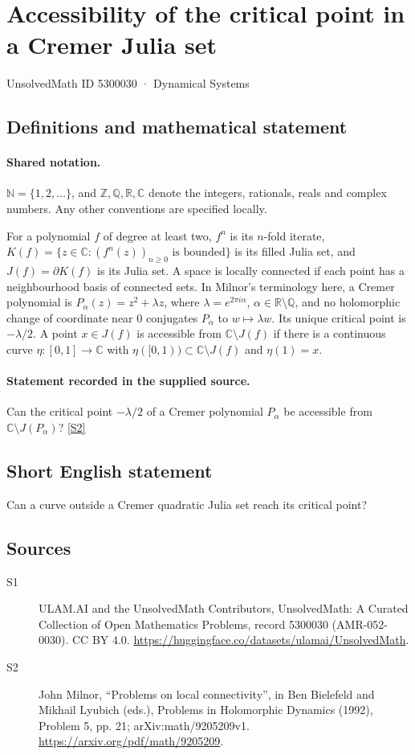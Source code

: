 \documentclass[11pt]{article}
\newcommand{\sref}[2]{\hyperlink{source:#1:#2}{[S#2]}}
\begin{document}
\setcounter{section}{5300029}
\section{Accessibility of the critical point in a Cremer Julia set}\label{5300030}
{\small\sffamily UnsolvedMath ID 5300030 · Dynamical Systems}
\subsection{Definitions and mathematical statement}

\paragraph{Shared notation.}$\mathbb N=\{1,2,\ldots\}$, and $\mathbb Z,\mathbb Q,\mathbb R,\mathbb C$ denote the integers, rationals, reals and complex numbers. Any other conventions are specified locally.


For a polynomial $f$ of degree at least two, $f^n$ is its $n$-fold iterate, $K(f)=\{z\in\mathbb C:(f^n(z))_{n\geq0}\text{ is bounded}\}$ is its filled Julia set, and $J(f)=\partial K(f)$ is its Julia set. A space is locally connected if each point has a neighbourhood basis of connected sets. In Milnor's terminology here, a Cremer polynomial is $P_\alpha(z)=z^2+\lambda z$, where $\lambda=e^{2\pi i\alpha}$, $\alpha\in\mathbb R\setminus\mathbb Q$, and no holomorphic change of coordinate near $0$ conjugates $P_\alpha$ to $w\mapsto\lambda w$. Its unique critical point is $-\lambda/2$. A point $x\in J(f)$ is accessible from $\mathbb C\setminus J(f)$ if there is a continuous curve $\eta:[0,1]\to\mathbb C$ with $\eta([0,1))\subset\mathbb C\setminus J(f)$ and $\eta(1)=x$.
\paragraph{Statement recorded in the supplied source.}
Can the critical point $-\lambda/2$ of a Cremer polynomial $P_\alpha$ be accessible from $\mathbb C\setminus J(P_\alpha)$? \sref{5300030}{2}
\subsection{Short English statement}
Can a curve outside a Cremer quadratic Julia set reach its critical point?
\subsection{Sources}
\begin{description}
\item[\hypertarget{source:5300030:1}{S1}] ULAM.AI and the UnsolvedMath Contributors, UnsolvedMath: A Curated Collection of Open Mathematics Problems, record 5300030 (AMR-052-0030). CC BY 4.0. \url{https://huggingface.co/datasets/ulamai/UnsolvedMath}.
\item[\hypertarget{source:5300030:2}{S2}] John Milnor, ``Problems on local connectivity'', in Ben Bielefeld and Mikhail Lyubich (eds.), Problems in Holomorphic Dynamics (1992), Problem 5, pp. 21; arXiv:math/9205209v1. \url{https://arxiv.org/pdf/math/9205209}.
\end{description}
\label{end:5300030}
\end{document}
